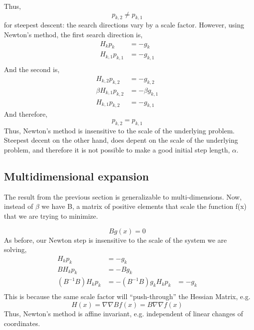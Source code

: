 \documentclass{article}
\begin{document}
Thus, 
\begin{equation}
p_{k,2} \ne p_{k,1}
\end{equation}
for steepest descent: the search directions
vary by a scale factor. However, using Newton's method, the first search
direction is,
\begin{align*}
 H_k p_k&=-g_k \\
 H_{k,1} p_{k,1}&=-g_{k,1}\\
\end{align*}
And the second is,
\begin{align*}
 H_{k,2} p_{k,2}&=-g_{k,2}\\
 \beta H_{k,1} p_{k,2}&=- \beta g_{k,1}\\
 H_{k,1} p_{k,2}&=-g_{k,1}
\end{align*}
And therefore, 
\begin{equation}
p_{k,2} = p_{k,1}
\end{equation}
Thus, Newton's method is insensitive to the scale of the underlying
problem. Steepest decent on the other hand, does depent on the scale of
the underlying problem, and therefore it is not possible to make a good
initial step length, $\alpha$.

\subsection{Multidimensional expansion}

The result from the previous section is generalizable to
multi-dimensions. Now, instead of $\beta$ we have B, a matrix of
positive elements that scale the function f(x) that we are trying to
minimize. 

\begin{equation}
 Bg(x) = 0
\end{equation}
As before, our Newton step is insensitive to the scale of the system we
are solving, 
\begin{align*}
 H_{k} p_{k}&=-g_{k}\\
 B H_{k} p_{k}&=- B g_{k}\\
 (B^{-1}B)H_{k} p_{k}&=-(B^{-1}B)g_{k}
 H_{k} p_{k}&=-g_{k}\\
\end{align*}
This is because the same scale factor will ``push-through'' the Hessian
Matrix, e.g. 
\begin{equation}
H(x) = \nabla\nabla B f(x) = B \nabla\nabla f(x) 
\end{equation}
Thus, Newton's method is affine invariant, e.g. independent of linear
changes of coordinates. 
\end{document}
